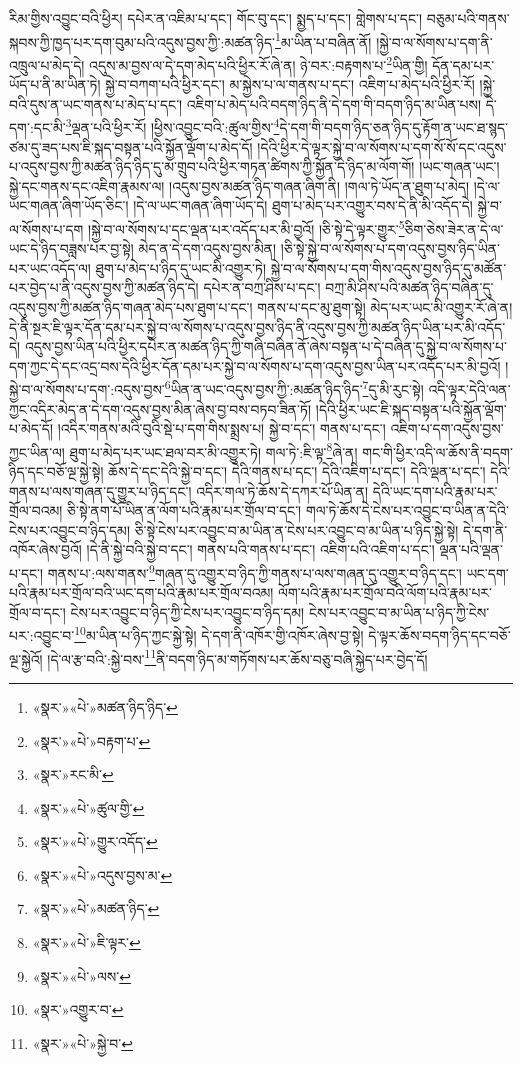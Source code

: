 རིམ་གྱིས་འབྱུང་བའི་ཕྱིར། དཔེར་ན་འཇིམ་པ་དང་། གོང་བུ་དང་། སྨྱད་པ་དང་། གླེགས་པ་དང་། བཅུམ་པའི་གནས་སྐབས་ཀྱི་ཁྱད་པར་དག་བུམ་པའི་འདུས་བྱས་ཀྱི་:མཚན་ཉིད་\footnote{«སྣར་»«པེ་»མཚན་ཉིད་ཉིད་}མ་ཡིན་པ་བཞིན་ནོ། །སྐྱེ་བ་ལ་སོགས་པ་དག་ནི་འཁྲུལ་པ་མེད་དེ། འདུས་མ་བྱས་ལ་དེ་དག་མེད་པའི་ཕྱིར་རོ་ཞེ་ན། ཉེ་བར་:བརྟགས་པ་\footnote{«སྣར་»«པེ་»བརྟག་པ་}ཡིན་གྱི། དོན་དམ་པར་ཡོད་པ་ནི་མ་ཡིན་ཏེ། སྐྱེ་བ་བཀག་པའི་ཕྱིར་དང་། མ་སྐྱེས་པ་ལ་གནས་པ་དང་། འཇིག་པ་མེད་པའི་ཕྱིར་རོ། །སྐྱེ་བའི་དུས་ན་ཡང་གནས་པ་མེད་པ་དང་། འཇིག་པ་མེད་པའི་བདག་ཉིད་ནི་དེ་དག་གི་བདག་ཉིད་མ་ཡིན་པས། དེ་དག་:དང་མི་\footnote{«སྣར་»རང་མི་}ལྡན་པའི་ཕྱིར་རོ། །ཕྱིས་འབྱུང་བའི་:ཚུལ་གྱིས་\footnote{«སྣར་»«པེ་»ཚུལ་གྱི་}དེ་དག་གི་བདག་ཉིད་ཅན་ཉིད་དུ་རྟོག་ན་ཡང་ཐ་སྙད་ཙམ་དུ་ཟད་པས་ཇི་སྐད་བསྟན་པའི་སྐྱོན་ལྡོག་པ་མེད་དོ། །དེའི་ཕྱིར་དེ་ལྟར་སྐྱེ་བ་ལ་སོགས་པ་དག་སོ་སོ་དང་འདུས་པ་འདུས་བྱས་ཀྱི་མཚན་ཉིད་ཉིད་དུ་མ་གྲུབ་པའི་ཕྱིར་གཏན་ཚིགས་ཀྱི་སྐྱོན་དེ་ཉིད་མ་ལོག་གོ། །ཡང་གཞན་ཡང་། སྐྱེ་དང་གནས་དང་འཇིག་རྣམས་ལ། །འདུས་བྱས་མཚན་ཉིད་གཞན་ཞིག་ནི། །གལ་ཏེ་ཡོད་ན་ཐུག་པ་མེད། །དེ་ལ་ཡང་གཞན་ཞིག་ཡོད་ཅིང་། །དེ་ལ་ཡང་གཞན་ཞིག་ཡོད་དེ། ཐུག་པ་མེད་པར་འགྱུར་བས་དེ་ནི་མི་འདོད་དེ། སྐྱེ་བ་ལ་སོགས་པ་དག །སྐྱེ་བ་ལ་སོགས་པ་དང་ལྡན་པར་འདོད་པར་མི་བྱའོ། །ཅི་སྟེ་དེ་ལྟར་གྱུར་\footnote{«སྣར་»«པེ་»གྱུར་འདོད་}ཅིག་ཅེས་ཟེར་ན་དེ་ལ་ཡང་དེ་ཉིད་བཟླས་པར་བྱ་སྟེ། མེད་ན་དེ་དག་འདུས་བྱས་མིན། །ཅི་སྟེ་སྐྱེ་བ་ལ་སོགས་པ་དག་འདུས་བྱས་ཉིད་ཡིན་པར་ཡང་འདོད་ལ། ཐུག་པ་མེད་པ་ཉིད་དུ་ཡང་མི་འགྱུར་ཏེ། སྐྱེ་བ་ལ་སོགས་པ་དག་གིས་འདུས་བྱས་ཉིད་དུ་མཚོན་པར་བྱེད་པ་ནི་འདུས་བྱས་ཀྱི་མཚན་ཉིད་དེ། དཔེར་ན་བཀྲ་ཤིས་པ་དང་། བཀྲ་མི་ཤིས་པའི་མཚན་ཉིད་བཞིན་དུ་འདུས་བྱས་ཀྱི་མཚན་ཉིད་གཞན་མེད་པས་ཐུག་པ་དང་། གནས་པ་དང་མུ་ཐུག་སྟེ། མེད་པར་ཡང་མི་འགྱུར་རོ་ཞེ་ན། དེ་ནི་སྔར་ཇི་ལྟར་དོན་དམ་པར་སྐྱེ་བ་ལ་སོགས་པ་འདུས་བྱས་ཉིད་ནི་འདུས་བྱས་ཀྱི་མཚན་ཉིད་ཡིན་པར་མི་འདོད་དེ། འདུས་བྱས་ཡིན་པའི་ཕྱིར་དཔེར་ན་མཚན་ཉིད་ཀྱི་གཞི་བཞིན་ནོ་ཞེས་བསྟན་པ་དེ་བཞིན་དུ་སྐྱེ་བ་ལ་སོགས་པ་དག་ཀྱང་དེ་དང་འདྲ་བས་དེའི་ཕྱིར་དོན་དམ་པར་སྐྱེ་བ་ལ་སོགས་པ་དག་འདུས་བྱས་ཡིན་པར་འདོད་པར་མི་བྱའོ། །སྐྱེ་བ་ལ་སོགས་པ་དག་:འདུས་བྱས་\footnote{«སྣར་»«པེ་»འདུས་བྱས་མ་}ཡིན་ན་ཡང་འདུས་བྱས་ཀྱི་:མཚན་ཉིད་ཉིད་\footnote{«སྣར་»«པེ་»མཚན་ཉིད་}དུ་མི་རུང་སྟེ། འདི་ལྟར་དེའི་ལན་ཀྱང་འདིར་མེད་ན་དེ་དག་འདུས་བྱས་མིན་ཞེས་བྱ་བས་བཏབ་ཟིན་ཏོ། །དེའི་ཕྱིར་ཡང་ཇི་སྐད་བསྟན་པའི་སྐྱོན་ལྡོག་པ་མེད་དོ། །འདིར་གནས་མའི་བུའི་སྡེ་པ་དག་གིས་སྨྲས་པ། སྐྱེ་བ་དང་། གནས་པ་དང་། འཇིག་པ་དག་འདུས་བྱས་ཀྱང་ཡིན་ལ། ཐུག་པ་མེད་པར་ཡང་ཐལ་བར་མི་འགྱུར་ཏེ། གལ་ཏེ་:ཇི་ལྟ་\footnote{«སྣར་»«པེ་»ཇི་ལྟར་}ཞེ་ན། གང་གི་ཕྱིར་འདི་ལ་ཆོས་ནི་བདག་ཉིད་དང་བཅོ་ལྔ་སྐྱེ་སྟེ། ཆོས་དེ་དང་དེའི་སྐྱེ་བ་དང་། དེའི་གནས་པ་དང་། དེའི་འཇིག་པ་དང་། དེའི་ལྡན་པ་དང་། དེའི་གནས་པ་ལས་གཞན་དུ་གྱུར་པ་ཉིད་དང་། འདིར་གལ་ཏེ་ཆོས་དེ་དཀར་པོ་ཡིན་ན། དེའི་ཡང་དག་པའི་རྣམ་པར་གྲོལ་བའམ། ཅི་སྟེ་ནག་པོ་ཡིན་ན་ལོག་པའི་རྣམ་པར་གྲོལ་བ་དང་། གལ་ཏེ་ཆོས་དེ་ངེས་པར་འབྱུང་བ་ཡིན་ན་དེའི་ངེས་པར་འབྱུང་བ་ཉིད་དམ། ཅི་སྟེ་ངེས་པར་འབྱུང་བ་མ་ཡིན་ན་ངེས་པར་འབྱུང་བ་མ་ཡིན་པ་ཉིད་སྐྱེ་སྟེ། དེ་དག་ནི་འཁོར་ཞེས་བྱའོ། །དེ་ནི་སྐྱེ་བའི་སྐྱེ་བ་དང་། གནས་པའི་གནས་པ་དང་། འཇིག་པའི་འཇིག་པ་དང་། ལྡན་པའི་ལྡན་པ་དང་། གནས་པ་:ལས་གནས་\footnote{«སྣར་»«པེ་»ལས་}གཞན་དུ་འགྱུར་བ་ཉིད་ཀྱི་གནས་པ་ལས་གཞན་དུ་འགྱུར་བ་ཉིད་དང་། ཡང་དག་པའི་རྣམ་པར་གྲོལ་བའི་ཡང་དག་པའི་རྣམ་པར་གྲོལ་བའམ། ལོག་པའི་རྣམ་པར་གྲོལ་བའི་ལོག་པའི་རྣམ་པར་གྲོལ་བ་དང་། ངེས་པར་འབྱུང་བ་ཉིད་ཀྱི་ངེས་པར་འབྱུང་བ་ཉིད་དམ། ངེས་པར་འབྱུང་བ་མ་ཡིན་པ་ཉིད་ཀྱི་ངེས་པར་:འབྱུང་བ་\footnote{«སྣར་»འགྱུར་བ་}མ་ཡིན་པ་ཉིད་ཀྱང་སྐྱེ་སྟེ། དེ་དག་ནི་འཁོར་གྱི་འཁོར་ཞེས་བྱ་སྟེ། དེ་ལྟར་ཆོས་བདག་ཉིད་དང་བཅོ་ལྔ་སྐྱེའོ། །དེ་ལ་རྩ་བའི་:སྐྱེ་བས་\footnote{«སྣར་»«པེ་»སྐྱེ་བ་}ནི་བདག་ཉིད་མ་གཏོགས་པར་ཆོས་བཅུ་བཞི་སྐྱེད་པར་བྱེད་དོ། 
